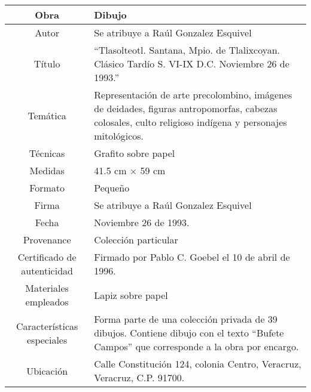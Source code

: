 \documentclass[10pt,letter]{report}
\begin{document}
\begin{table}[H]
\centering
\begin{tabular}{|c|m{}|}
\hline
Obra& Dibujo	\\
\hline
Autor & Se atribuye a Ra\'ul Gonzalez Esquivel\\
\hline
T\'itulo & ``Tlasolteotl. Santana, Mpio. de Tlalixcoyan. Cl\'asico Tard\'io S. VI-IX D.C. Noviembre 26 de 1993.''\\
\hline
Tem\'atica & Representaci\'on de arte precolombino, im\'agenes de deidades, figuras antropomorfas, cabezas colosales, culto religioso ind\'igena y personajes mitol\'ogicos.\\
\hline
T\'ecnicas &Grafito sobre papel \\
\hline
Medidas & 41.5 cm $\times$ 59 cm \\
\hline
 Formato & Peque\~no \\
 \hline
 Firma & Se atribuye a Ra\'ul Gonzalez Esquivel\\ 
 \hline
  Fecha & Noviembre 26 de 1993. \\
 \hline
 Provenance & Colecci\'on particular\\
 \hline
 Certificado de autenticidad& Firmado por Pablo C. Goebel el 10 de abril de 1996.  \\
 \hline 
  Materiales empleados & Lapiz sobre papel\\
 \hline
 Caracter\'isticas especiales & Forma parte de una colecci\'on privada de 39 dibujos. 
Contiene dibujo con el texto ``Bufete Campos'' que corresponde a la obra por encargo. \\
\hline 
Ubicaci\'on & Calle Constituci\'on 124, colonia Centro, Veracruz, Veracruz, C.P. 91700.\\
\hline

\end{tabular}
\end{table}
\end{document}
